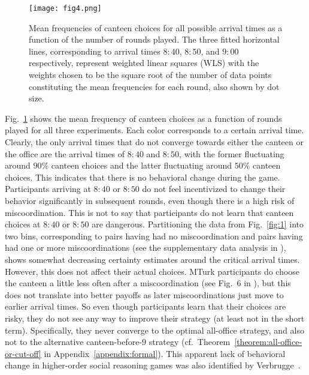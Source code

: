 \begin{figure} %
\centering\texttt{[image: fig4.png]}
\caption{Mean frequencies of canteen choices for all possible arrival times as a function of the number of rounds played. The three fitted horizontal lines, corresponding to arrival times $8{:}40$, $8{:}50$, and $9{:}00$ respectively, represent weighted linear squares (WLS) with the weights chosen to be the square root of the number of data points constituting the mean frequencies for each round, also shown by dot size.}
\label{timeseries}
\end{figure}
Fig.~\ref{timeseries} shows the mean frequency of canteen choices as a function of rounds played for all three experiments. Each color corresponds to a certain arrival time. Clearly, the only arrival times that do not converge towards either the canteen or the office are the arrival times of $8{:}40$ and $8{:}50$, with the former fluctuating around $90\%$ canteen choices and the latter fluctuating around $50\%$ canteen choices. This indicates that there is no behavioral change during the game. Participants arriving at $8{:}40$ or $8{:}50$ do not feel incentivized to change their behavior significantly in subsequent rounds, even though there is a high risk of miscoordination. This is not to say that participants do not learn that canteen choices at $8{:}40$ or $8{:}50$ are dangerous. Partitioning the data from Fig.~\ref{fig:1} into two bins, corresponding to pairs having had no miscoordination and pairs having had one or more miscoordinations (see the supplementary data analysis in ), shows somewhat decreasing certainty estimates around the critical arrival times. However, this does not affect their actual choices. MTurk participants do choose the canteen a little less often after a miscoordination (see Fig.~6 in ), but this does not translate into better payoffs as later miscoordinations just move to earlier arrival times. So even though participants learn that their choices are risky, they do not see any way to improve their strategy (at least not in the short term). Specifically, they never converge to the optimal all-office strategy, and also not to the alternative canteen-before-9 strategy (cf.\ Theorem~\ref{theorem:all-office-or-cut-off} in Appendix~\ref{appendix:formal}). This apparent lack of behavioral change in higher-order social reasoning games was also identified by Verbrugge~\cite{verbrugge2008learning}. 

